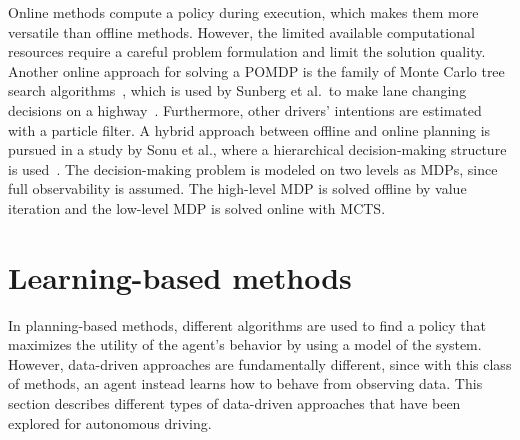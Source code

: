 Online methods compute a policy during execution, which makes them more versatile than offline methods. However, the limited available computational resources require a careful problem formulation and limit the solution quality.
Another online approach for solving a POMDP is the family of Monte Carlo tree search algorithms~\cite{Browne2012}, which is used by Sunberg et al.\ to make lane changing decisions on a highway~\cite{Sunberg2017}. 
Furthermore, other drivers' intentions are estimated with a particle filter. %
A hybrid approach between offline and online planning is pursued in a study by Sonu et al., where a hierarchical decision-making structure is used~\cite{Sonu2018}. The decision-making problem is modeled on two levels as MDPs, since full observability is assumed. The high-level MDP is solved offline by value iteration and the low-level MDP is solved online with MCTS.


\vspace{8pt}

\section{Learning-based methods}

In planning-based methods, different algorithms are used to find a policy that maximizes the utility of the agent's behavior by using a model of the system. However, data-driven approaches are fundamentally different, since with this class of methods, an agent instead learns how to behave from observing data. This section describes different types of data-driven approaches that have been explored for autonomous driving.

